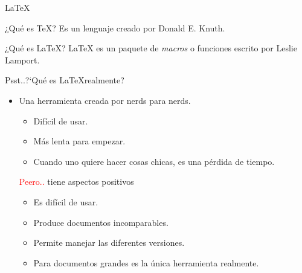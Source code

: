 
\begin{frame}{\LaTeX}
    \begin{block}{¿Qu\'e es \TeX ?}
        Es un lenguaje creado por Donald E. Knuth. 
    \end{block}
    \begin{block}{¿Qu\'e es \LaTeX{}?}
        \LaTeX{} es un paquete de \emph{macros} o funciones escrito por Leslie Lamport.
    \end{block}
\end{frame}


\begin{frame}{Psst..?`Qu\'e es \LaTeX realmente?}
    \begin{itemize}
        \item Una herramienta creada por nerds para nerds.
            \begin{itemize}
                \item Dif\'icil de usar.\pause
                \item M\'as lenta para empezar.\pause
                \item Cuando uno quiere hacer cosas chicas, es una p\'erdida de tiempo.\pause
            \end{itemize}
            \textcolor{red}{Peero..} tiene aspectos positivos \pause\\
            \begin{itemize}
                \item Es dif\'icil de usar.
                \item Produce documentos incomparables.
                \item Permite manejar las diferentes versiones.
                \item Para documentos grandes es la \'unica herramienta realmente.
            \end{itemize}
    \end{itemize}
\end{frame}


%	

